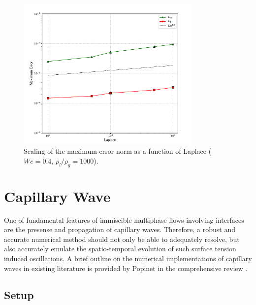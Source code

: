 \begin{figure}
    \centering
    \includegraphics[width = 0.8\textwidth]{plots/droplet_advect/laplaces.pdf}
\caption{ Scaling of the maximum error norm as a function of Laplace ($We = 0.4$, $\rho_l / \rho_g = 1000$). }
    \label{lap}
\end{figure}




\section{Capillary Wave}
One of fundamental features of immiscible multiphase flows involving interfaces are the presense and propagation of capillary waves. Therefore, a robust and accurate numerical method should not only be able to adequately resolve, but also accurately emulate the spatio-temporal evolution of such surface tension induced oscillations. A brief outline on the numerical implementations of capillary waves in existing literature is provided by Popinet in the comprehensive review .

\subsection*{Setup}

